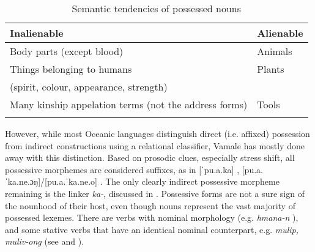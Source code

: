 \begin{table}
	\caption{Semantic tendencies of possessed nouns}
	\begin{tabular}{ll}
		\lsptoprule
		Inalienable&	Alienable\\
		\midrule
		Body parts (except blood)&	Animals\\
		Things belonging to humans &	Plants\\
		(spirit, colour, appearance, strength)&\\
		Many kinship appelation terms (not the address forms)&	Tools\\
		\lspbottomrule
	\end{tabular}
\label{tab:semantic_poss}
\end{table}

\begin{sloppypar}
However, while most Oceanic languages distinguish direct (i.e. affixed) possession from indirect constructions using a relational classifier, Vamale has mostly done away with this distinction. Based on prosodic clues, especially stress shift, all possessive morphemes are considered suffixes, as in [ˈpu.a.ka] , [pu.a.ˈka.ne.ɔŋ]\slash [pu.a.ˈka.ne.o] . The only clearly indirect possessive morpheme remaining is the linker \textit{ka-}, discussed in .
Possessive forms are not a sure sign of the nounhood of their host, even though nouns represent the vast majority of possessed lexemes. There are verbs with nominal morphology (e.g. \textit{hmana-n} ), and some stative verbs that have an identical nominal counterpart, e.g. \textit{mulip, muliv-ong}  (see  and ).
\end{sloppypar}


